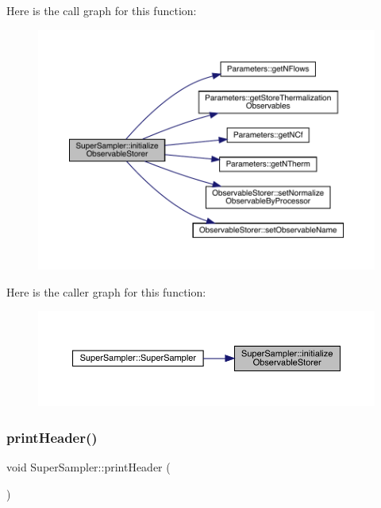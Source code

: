 Here is the call graph for this function\+:
\nopagebreak
\begin{figure}[H]
\begin{center}
\leavevmode
\includegraphics[width=350pt]{class_super_sampler_a4429d6ae37247a02259bc0c6d665821c_cgraph}
\end{center}
\end{figure}
Here is the caller graph for this function\+:
\nopagebreak
\begin{figure}[H]
\begin{center}
\leavevmode
\includegraphics[width=350pt]{class_super_sampler_a4429d6ae37247a02259bc0c6d665821c_icgraph}
\end{center}
\end{figure}
\mbox{\label{class_super_sampler_a9bedfcc40a22c48378a6ed63f64e6957}} 
\subsubsection{\texorpdfstring{printHeader()}{printHeader()}}
{\footnotesize\ttfamily void Super\+Sampler\+::print\+Header (\begin{DoxyParamCaption}{ }\end{DoxyParamCaption})\hspace{0.3cm}{\ttfamily [virtual]}}



